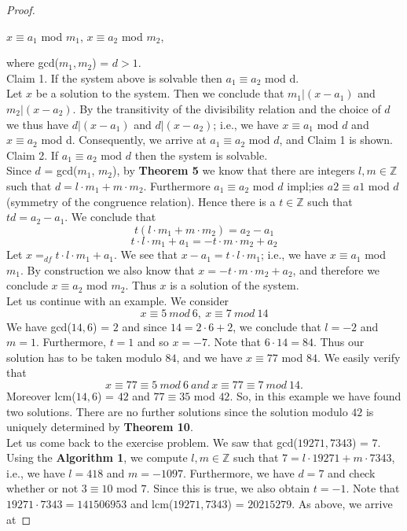 \documentclass[a4paper]{article}
\begin{document}
\begin{proof}
\begin{center}
$x \equiv a_{1}$ mod $m_{1}$, $x \equiv a_{2}$ mod $m_{2}$,
\end{center}
where gcd($m_{1}, m_{2}$) = $d > 1$. \\
Claim 1. If the system above is solvable then $a_{1} \equiv a_{2}$ mod d. \\
Let $x$ be a solution to the system. Then we conclude that $m_{1}|(x-a_{1})$ and $m_{2}|(x-a_{2})$. By the transitivity of the divisibility relation and the choice of $d$ we thus have $d|(x-a_{1})$ and $d|(x-a_{2})$; i.e., we have $x \equiv a_{1}$ mod $d$ and $x \equiv a_{2}$ mod d. Consequently, we arrive at $a_{1} \equiv a_{2}$ mod $d$, and Claim 1 is shown. \\
Claim 2. If $a_{1} \equiv a_{2}$ mod $d$ then the system is solvable. \\
Since $d$ = gcd($m_{1}$, $m_{2}$), by \textbf{Theorem 5} we know that there are integers $l, m \in \mathbb{Z}$ such that $d = l \cdot m_{1} + m \cdot m_{2}$. Furthermore $a_{1} \equiv a_{2}$ mod $d$ impl;ies $a{2} \equiv a{1}$ mod $d$ (symmetry of the congruence relation). Hence there is a $t \in \mathbb{Z}$ such that $td = a_{2} - a_{1}$. We conclude that
$$t(l \cdot m_{1} + m \cdot m_{2}) = a_{2} - a_{1} $$
$$t \cdot l \cdot m_{1} + a_{1} = -t \cdot m \cdot m_{2} + a_{2}$$
Let $x =_{df} t \cdot l \cdot m_{1} + a_{1}$. We see that $x - a_{1} = t \cdot l \cdot m_{1}$; i.e., we have $x \equiv a_{1}$ mod $m_{1}$. By construction we also know that $x = -t \cdot m \cdot m_{2} + a_{2}$, and therefore we conclude $x \equiv a_{2}$ mod $m_{2}$. Thus $x$ is a solution of the system.\\
Let us continue with an example. We consider
$$ x \equiv 5\ mod\ 6,\ x \equiv 7\ mod\ 14$$
We have gcd($14,6$) = $2$ and since $14 = 2 \cdot 6 + 2$, we conclude that $l = -2$ and $m = 1$. Furthermore, $t = 1$ and so $x = -7$. Note that $6 \cdot 14 = 84$. Thus our solution has to be taken modulo $84$, and we have $x \equiv 77$ mod $84$. We easily verify that
$$x \equiv 77 \equiv 5\ mod\ 6\ and\ x \equiv 77 \equiv 7\ mod\ 14.$$
Moreover lcm($14, 6$) = $42$ and $77 \equiv 35$ mod $42$. So, in this example we have found two solutions. There are no further solutions since the solution modulo $42$ is uniquely determined by \textbf{Theorem 10}.\\
Let us come back to the exercise problem. We saw that gcd($19271, 7343$) = $7$. Using the \textbf{Algorithm 1}, we compute $l, m \in \mathbb{Z}$ such that $7 = l \cdot 19271 + m \cdot 7343$, i.e., we have $l = 418$ and $m = -1097$. Furthermore, we have $d = 7$ and check whether or not $3 \equiv 10$ mod $7$. Since this is true, we also obtain $t = -1$. Note that $19271 \cdot 7343 = 141506953$ and lcm($19271, 7343$) = $20215279$. As above, we arrive at

\end{proof}
\end{document}
